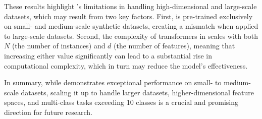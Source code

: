 These results highlight \ours's limitations in handling high-dimensional and large-scale datasets, which may result from two key factors. First, \ours is pre-trained exclusively on small- and medium-scale synthetic datasets, creating a mismatch when applied to large-scale datasets. Second, the complexity of transformers in \ours scales with both $N$ (the number of instances) and $d$ (the number of features), meaning that increasing either value significantly can lead to a substantial rise in computational complexity, which in turn may reduce the model's effectiveness.

In summary, while \ours demonstrates exceptional performance on small- to medium-scale datasets, scaling it up to handle larger datasets, higher-dimensional feature spaces, and multi-class tasks exceeding 10 classes is a crucial and promising direction for future research.